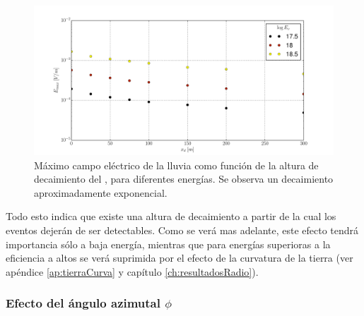 	\begin{figure}[ht!]
		\centering
		\includegraphics[width=\textwidth]{./fig/simulacionRadio/maxDep/eMaxXd}
		\caption{\label{fig:xd_dependence2}
		M\'aximo campo el\'ectrico de la lluvia como funci\'on de la altura de decaimiento del \tauon{}, para diferentes energ\'ias.
		Se observa un decaimiento aproximadamente exponencial.
		}
	\end{figure}
	
	Todo esto indica que existe una altura de decaimiento a partir de la cual los eventos dejer\'an de ser detectables. 
	Como se ver\'a mas adelante, este efecto tendr\'a importancia s\'olo a baja energ\'ia, mientras que para energ\'ias superioras a  la eficiencia a altos \xd{} se ver\'a suprimida por el efecto de la curvatura de la tierra (ver ap\'endice \ref{ap:tierraCurva} y cap\'itulo \ref{ch:resultadosRadio}).
	
	\subsubsection{Efecto del \'angulo azimutal $\phi$}
	
